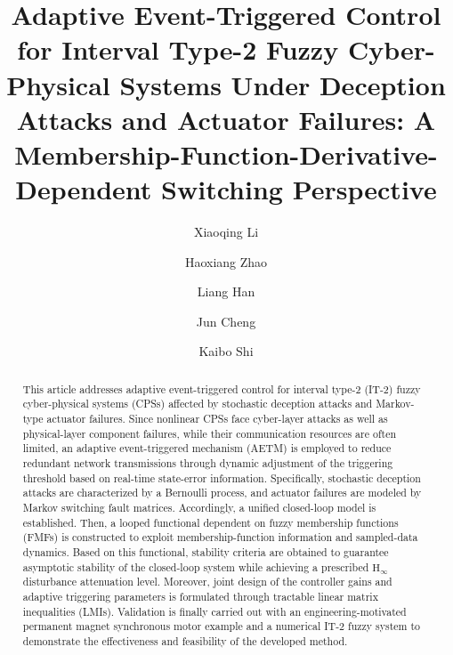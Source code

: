 \documentclass[preprint,review,fleqn,sort&compress,3p]{elsarticle}
\theoremstyle{definition} %
\theoremstyle{definition}%
\begin{document}
	\begin{frontmatter}
		
		\title{{Adaptive Event-Triggered Control for 
				Interval Type-2 Fuzzy Cyber-Physical Systems Under Deception Attacks 
				and Actuator Failures: A Membership-Function-Derivative-Dependent 
				Switching Perspective
		}}
		
		\author[a]{Xiaoqing Li}
		\author[a]{Haoxiang Zhao}
		\author[a]{Liang Han}
		\author[b]{Jun Cheng}
		\author[c]{Kaibo Shi}
		
		\address[a]{School of Electrical Engineering and Automation, Hefei University of Technology, Hefei 230009, China}
		\address[b]{College of Mathematics and Statistics, Guangxi Normal University, Guilin 541006, China}
		\address[c]{School of Electronic Information and Electrical Engineering, Chengdu University, Chengdu 610106, China}
		
		{}
		
\begin{abstract}
This article addresses adaptive event-triggered control for interval type-2 (IT-2) fuzzy cyber-physical systems (CPSs) affected by stochastic deception attacks and Markov-type actuator failures. Since nonlinear CPSs face cyber-layer attacks as well as physical-layer component failures, while their communication resources are often limited, an adaptive event-triggered mechanism (AETM) is employed to reduce redundant network transmissions through dynamic adjustment of the triggering threshold based on real-time state-error information. Specifically, stochastic deception attacks are characterized by a Bernoulli process, and actuator failures are modeled by Markov switching fault matrices. Accordingly, a unified closed-loop model is established. Then, a looped functional dependent on fuzzy membership functions (FMFs) is constructed to exploit membership-function information and sampled-data dynamics. Based on this functional, stability criteria are obtained to guarantee asymptotic stability of the closed-loop system while achieving a prescribed $\mathrm{H}_\infty$ disturbance attenuation level. Moreover, joint design of the controller gains and adaptive triggering parameters is formulated through tractable linear matrix inequalities (LMIs). Validation is finally carried out with an engineering-motivated permanent magnet synchronous motor example and a numerical IT-2 fuzzy system to demonstrate the effectiveness and feasibility of the developed method.


\end{abstract}
\end{frontmatter}
\end{document}
